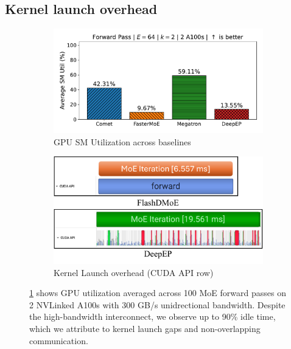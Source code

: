 \subsection{Kernel launch overhead}\label{subsec:kernel-launch-overhead.}
\begin{figure}[!h]
    \centering
    \begin{subfigure}{0.425\textwidth}
        \centering
        \includegraphics[width=\linewidth, keepaspectratio]{figures/sm_util_b}
        \caption{GPU SM Utilization across baselines}
        \label{sub:util}
    \end{subfigure}
    \begin{subfigure}{0.425\textwidth}
        \centering
        \includegraphics[width=\textwidth, keepaspectratio]{figures/kernel_launch}
        \caption{Kernel Launch overhead (CUDA API row)}
        \label{sub:launch}
    \end{subfigure}
    \caption{\ref{sub:util} shows GPU utilization averaged across 100 MoE forward passes on 2 NVLinked A100s with
    300 GB/s unidrectional bandwidth.
    Despite the high-bandwidth interconnect, we observe up to 90\% idle time,
        which we attribute to kernel launch gaps and non-overlapping communication.}
    \label{fig:kl}
\end{figure}
